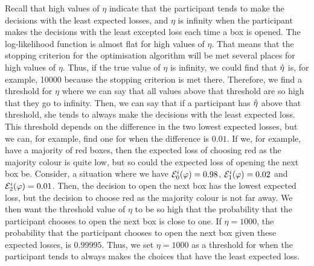  

Recall that high values of $\eta$ indicate that the participant tends to make the decisions with the least expected losses, and $\eta$ is infinity when the participant makes the decisions with the least excepted loss each time a box is opened.  
The log-likelihood function is almost flat for high values of $\eta$. That means that the stopping criterion for the optimisation algorithm will be met several places for high values of $\eta$. Thus, if the true value of $\eta$ is infinity, we could find that $\hat{\eta}$ is, for example, 10000 because the stopping criterion is met there. Therefore, we find a threshold for $\eta$ where we can say that all values above that threshold are so high that they go to infinity. Then, we can say that if a participant has $\hat{\eta}$ above that threshold, she tends to always make the decisions with the least expected loss. This threshold depends on the difference in the two lowest expected losses, but we can, for example, find one for when the difference is $0.01$.  If we, for example, have a majority of red boxes, then the expected loss of choosing red as the majority colour is quite low, but so could the expected loss of opening the next box be. Consider, a situation where we have $\mathcal{E}_0^i(\varphi)=0.98$, $\mathcal{E}_1^i(\varphi)=0.02$ and $\mathcal{E}_2^i(\varphi)=0.01$. Then, the decision to open the next box has the lowest expected loss, but the decision to choose red as the majority colour is not far away. We then want the threshold value of $\eta$ to be so high that the probability that the participant chooses to open the next box is close to one. If $\eta=1000$, the probability that the participant chooses to open the next box given these expected losses, is $0.99995$. Thus, we set $\eta=1000$ as a threshold for when the participant tends to
always makes the choices that have the least expected loss.

